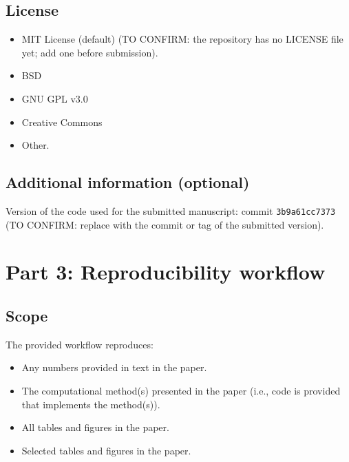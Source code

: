 \documentclass[11pt]{article}
\providecommand{\tightlist}{\setlength{\itemsep}{0pt}\setlength{\parskip}{0pt}}
\begin{document}
\hypertarget{license}{%
\subsection{License}\label{license}}

\begin{itemize}
\tightlist
\item[$\square$]
  MIT License (default) (TO CONFIRM: the repository has no LICENSE file
  yet; add one before submission).
\item[$\square$]
  BSD
\item[$\square$]
  GNU GPL v3.0
\item[$\square$]
  Creative Commons
\item[$\square$]
  Other.
\end{itemize}

\hypertarget{additional-information-optional-1}{%
\subsection{Additional information
(optional)}\label{additional-information-optional-1}}

Version of the code used for the submitted manuscript: commit
\texttt{3b9a61cc7373} (TO CONFIRM: replace with the commit or tag of the
submitted version).

\hypertarget{part-3-reproducibility-workflow}{%
\section{Part 3: Reproducibility
workflow}\label{part-3-reproducibility-workflow}}

\hypertarget{scope}{%
\subsection{Scope}\label{scope}}

The provided workflow reproduces:

\begin{itemize}
\tightlist
\item[$\boxtimes$]
  Any numbers provided in text in the paper.
\item[$\boxtimes$]
  The computational method(s) presented in the paper (i.e., code is
  provided that implements the method(s)).
\item[$\boxtimes$]
  All tables and figures in the paper.
\item[$\square$]
  Selected tables and figures in the paper.
\end{itemize}
\end{document}
